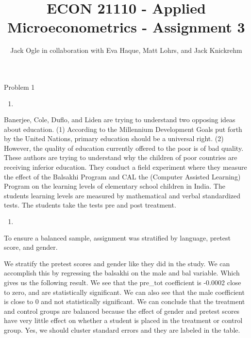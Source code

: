 \documentclass[
  12pt,
  landscape]{article}
\title{ECON 21110 - Applied Microeconometrics - Assignment 3}
\author{Jack Ogle in collaboration with Eva Haque, Matt Lohrs, and Jack
Knickrehm}
\date{}
\begin{document}
\maketitle

Problem 1

\begin{enumerate}
\def\labelenumi{(\alph{enumi})}
\item
\end{enumerate}

Banerjee, Cole, Duflo, and Liden are trying to understand two opposing
ideas about education. (1) According to the Millennium Development Goals
put forth by the United Nations, primary education should be a universal
right. (2) However, the quality of education currently offered to the
poor is of bad quality. These authors are trying to understand why the
children of poor countries are receiving inferior education. They
conduct a field experiment where they measure the effect of the Balsakhi
Program and CAL the (Computer Assisted Learning) Program on the learning
levels of elementary school children in India. The students learning
levels are measured by mathematical and verbal standardized tests. The
students take the tests pre and post treatment.

\begin{enumerate}
\def\labelenumi{(\alph{enumi})}
\setcounter{enumi}{1}
\item
\end{enumerate}

To ensure a balanced sample, assignment was stratified by language,
pretest score, and gender.

We stratify the pretest scores and gender like they did in the study. We
can accomplish this by regressing the balsakhi on the male and bal
variable. Which gives us the following result. We see that the pre\_tot
coefficient is -0.0002 close to zero, and are statistically significant.
We can also see that the male coefficient is close to 0 and not
statistically significant. We can conclude that the treatment and
control groups are balanced because the effect of gender and pretest
scores have very little effect on whether a student is placed in the
treatment or control group. Yes, we should cluster standard errors and
they are labeled in the table.
\end{document}
